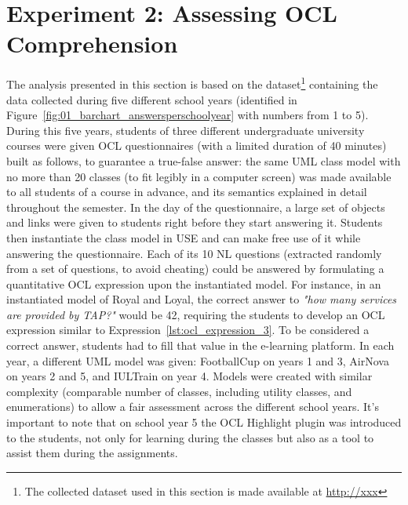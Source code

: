 \section{Experiment 2: Assessing OCL Comprehension}
\label{Results-2}

The analysis presented in this section is based on the dataset\footnote{The collected dataset used in this section is made available at \url{http://xxx}} containing the data collected during five different school years (identified in Figure~\ref{fig:01_barchart_answersperschoolyear} with numbers from 1 to 5). During this five years, students of three different undergraduate university courses were given OCL questionnaires (with a limited duration of 40 minutes) built as follows, to guarantee a true-false answer: the same UML class model with no more than 20 classes (to fit legibly in a computer screen) was made available to all students of a course in advance, and its semantics explained in detail throughout the semester. In the day of the questionnaire, a large set of objects and links were given to students right before they start answering it. Students then instantiate the class model in USE and can make free use of it while answering the questionnaire. Each of its 10 NL questions (extracted randomly from a set of questions, to avoid cheating) could be answered by formulating a quantitative OCL expression upon the instantiated model. For instance, in an instantiated model of Royal and Loyal, the correct answer to \textit{"how many services are provided by TAP?"} would be 42, requiring the students to develop an OCL expression similar to Expression~\ref{lst:ocl_expression_3}. To be considered a correct answer, students had to fill that value in the e-learning platform. In each year, a different UML model was given: FootballCup on years 1 and 3, AirNova on years 2 and 5, and IULTrain on year 4. Models were created with similar complexity (comparable number of classes, including utility classes, and enumerations) to allow a fair assessment across the different school years. It's important to note that on school year 5 the OCL Highlight plugin was introduced to the students, not only for learning during the classes but also as a tool to assist them during the assignments.

